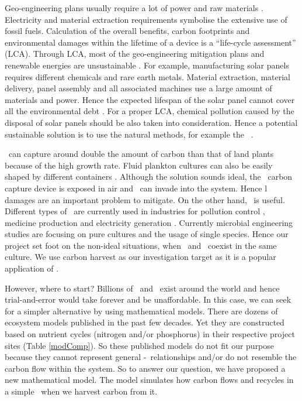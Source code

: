 \documentclass[../thesis.tex]{subfiles} %
\begin{document}
Geo-engineering plans usually require a lot of power and raw materials \autocite{boyd2008ranking,boyd2008implications,mcclellan2012cost}.  Electricity and material extraction requirements symbolise the extensive use of fossil fuels.  Calculation of the overall benefits, carbon footprints and environmental damages within the lifetime of a device is a ``life-cycle assessment” (LCA).  Through LCA, most of the geo-engineering mitigation plans and renewable energies are unsustainable \autocite{abdussalam2020green}.  For example, manufacturing solar panels requires different chemicals and rare earth metals.  Material extraction, material delivery, panel assembly and all associated machines use a large amount of materials and power.  Hence the expected lifespan of the solar panel cannot cover all the environmental debt \autocite{martinopoulos2020rooftop}.  For a proper LCA, chemical pollution caused by the disposal of solar panels should be also taken into consideration.  Hence a potential sustainable solution is to use the natural methods, for example the \phy\ \autocite{farrelly2013carbon}.

\Phy\ can capture around double the amount of carbon than that of land plants \autocite{SCHLESINGER2013341} because of the high growth rate.  Fluid plankton cultures can also be easily shaped by different containers \autocite{evanson_2019}.  Although the solution sounds ideal, the \phy\ carbon capture device is exposed in air and \bac\ can invade into the system.  Hence \bac l damages are an important problem to mitigate.  On the other hand, \bac\ is useful.  Different types of \bac\ are currently used in industries for pollution control \autocite{dash2013marine,naik2013lead}, medicine production \autocite{huang2012industrial} and electricity generation \autocite{songera2012electricity}.  Currently microbial engineering studies are focusing on pure cultures and the usage of single species.  Hence our project set foot on the non-ideal situations, when \bac\ and \phy\ coexist in the same culture.  We use carbon harvest as our investigation target as it is a popular application of \phy.

However, where to start?  Billions of \phy\ and \bac\ exist around the world and hence trial-and-error would take forever and be unaffordable.  In this case, we can seek for a simpler alternative by using mathematical models.  There are dozens of ecosystem models published in the past few decades.  Yet they are constructed based on nutrient cycles (nitrogen and/or phosphorus) in their respective project sites (Table \ref{modComp}).  So these published models do not fit our purpose because they cannot represent general \phy-\bac\ relationships and/or do not resemble the carbon flow within the system.  So to answer our question, we have proposed a new mathematical model.  The model simulates how carbon flows and recycles in a simple \pbs\ when we harvest carbon from it.
\end{document}
